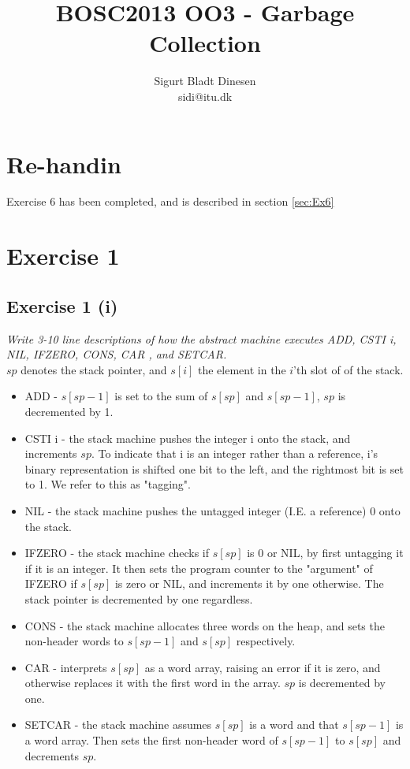 \documentclass[a4paper, titlepage]{article}
\begin{document}
\title{BOSC2013 OO3 - Garbage Collection}
\author{Sigurt Bladt Dinesen \\sidi{@}itu.dk}
\maketitle
\tableofcontents{}
\pagebreak

\section{Re-handin}
Exercise 6 has been completed, and is described in section \ref{sec:Ex6}

\section{Exercise 1}
\subsection{Exercise 1 (i)}
\textit{Write 3-10 line descriptions of how the abstract machine executes ADD,
CSTI i, NIL, IFZERO, CONS, CAR , and SETCAR.}\\

$sp$ denotes the stack pointer, and $s[i]$ the element in the $i$'th slot of of the stack.
\begin{itemize}
	\item ADD - $s[sp-1]$ is set to the sum of $s[sp]$ and $s[sp-1]$, $sp$
		is decremented by 1.
	\item CSTI i - the stack machine pushes the integer i onto the stack,
		and increments $sp$. To indicate that i is an integer rather
		than a reference, i's binary representation is shifted one bit
		to the left, and the rightmost bit is set to 1. We refer to this
		as "tagging".
	\item NIL - the stack machine pushes the untagged integer (I.E. a
		reference) 0 onto the stack.
	\item IFZERO - the stack machine checks if $s[sp]$ is 0 or NIL, by
		first untagging it if it is an integer. It then sets the program
		counter to the "argument" of IFZERO if $s[sp]$ is zero or NIL,
		and increments it by one otherwise. The stack pointer is
		decremented by one regardless.
	\item CONS - the stack machine allocates three words on the heap, and
		sets the non-header words to $s[sp-1]$ and $s[sp]$ respectively.
	\item CAR - interprets $s[sp]$ as a word array, raising an error if it
		is zero, and otherwise replaces it with the first word in the
		array. $sp$ is decremented by one.
	\item SETCAR - the stack machine assumes $s[sp]$ is a word and that
		$s[sp-1]$ is a word array. Then sets the first non-header word
		of $s[sp-1]$ to $s[sp]$ and decrements $sp$.
\end{itemize}
\end{document}

